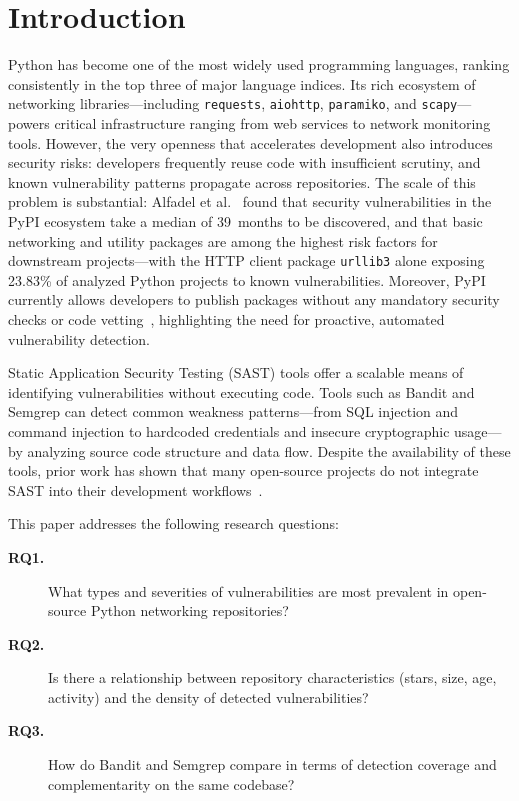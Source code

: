 \documentclass[sigconf,authordraft]{acmart}
\begin{document}

\maketitle

\section{Introduction}
\label{sec:intro}

Python has become one of the most widely used programming languages,
ranking consistently in the top three of major language indices. Its
rich ecosystem of networking libraries---including \texttt{requests},
\texttt{aiohttp}, \texttt{paramiko}, and \texttt{scapy}---powers
critical infrastructure ranging from web services to network
monitoring tools. However, the very openness that accelerates
development also introduces security risks: developers frequently
reuse code with insufficient scrutiny, and known vulnerability
patterns propagate across repositories. The scale of this problem is
substantial: Alfadel et al.~\cite{Alfadel2023} found that security
vulnerabilities in the PyPI ecosystem take a median of 39~months to
be discovered, and that basic networking and utility packages are
among the highest risk factors for downstream projects---with the
HTTP client package \texttt{urllib3} alone exposing 23.83\% of
analyzed Python projects to known vulnerabilities. Moreover, PyPI
currently allows developers to publish packages without any mandatory
security checks or code vetting~\cite{Alfadel2023}, highlighting the
need for proactive, automated vulnerability detection.

Static Application Security Testing (SAST) tools offer a scalable
means of identifying vulnerabilities without executing code. Tools
such as Bandit and Semgrep can detect common weakness
patterns---from SQL injection and command injection to hardcoded
credentials and insecure cryptographic usage---by analyzing source
code structure and data flow. Despite the availability of these
tools, prior work has shown that many open-source projects do not
integrate SAST into their development
workflows~\cite{Kaur2020, Ruohonen2021}.

This paper addresses the following research questions:

\begin{description}
  \item[\textbf{RQ1.}] What types and severities of vulnerabilities
    are most prevalent in open-source Python networking repositories?
  \item[\textbf{RQ2.}] Is there a relationship between repository
    characteristics (stars, size, age, activity) and the density of
    detected vulnerabilities?
  \item[\textbf{RQ3.}] How do Bandit and Semgrep compare in terms of
    detection coverage and complementarity on the same codebase?
\end{description}
\end{document}
